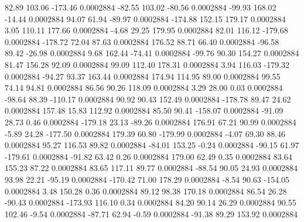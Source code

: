        82.89      103.06     -173.46     0.0002884
      -82.55      103.02      -80.56     0.0002884
      -99.93      168.02      -14.44     0.0002884
       94.07       61.94      -89.97     0.0002884
     -174.88      152.15      179.17     0.0002884
        3.05      110.11      177.66     0.0002884
       -4.68       29.25      179.95     0.0002884
       82.01      116.12     -179.68     0.0002884
     -178.72       72.04       87.63     0.0002884
      176.52       88.71       66.40     0.0002884
      -96.58       89.42      -26.98     0.0002884
        9.68      162.44      -74.41     0.0002884
      -99.76       90.30      154.27     0.0002884
       81.47      156.28       92.09     0.0002884
       99.09      112.40      178.31     0.0002884
        3.94      116.03     -179.32     0.0002884
      -94.27       93.37      163.44     0.0002884
      174.94      114.95       89.00     0.0002884
       99.55       74.14       94.81     0.0002884
       86.56       90.26      118.09     0.0002884
        3.29       28.00        0.03     0.0002884
      -98.64       88.39     -110.17     0.0002884
       90.92       90.43      152.49     0.0002884
     -178.78       89.47       24.62     0.0002884
      157.48       15.83      112.92     0.0002884
       85.50       90.41     -158.07     0.0002884
      -91.09       28.73        0.46     0.0002884
     -179.18       23.13      -89.26     0.0002884
      176.91       67.21       90.99     0.0002884
       -5.89       24.28     -177.50     0.0002884
      179.39       60.80     -179.99     0.0002884
       -4.07       69.30       88.46     0.0002884
       95.27      116.53       89.82     0.0002884
      -84.01      153.25       -0.24     0.0002884
      -90.15       61.97     -179.61     0.0002884
      -91.82       63.42        0.26     0.0002884
      179.00       62.49        0.35     0.0002884
       83.64      155.23       87.22     0.0002884
       83.65      117.11       89.77     0.0002884
      -88.54       90.05       24.93     0.0002884
       93.98       22.21      -95.19     0.0002884
     -170.42       71.00      178.29     0.0002884
       -8.54       90.63     -154.05     0.0002884
        3.48      150.28        0.36     0.0002884
       89.12       98.38      170.18     0.0002884
       86.54       26.28      -90.43     0.0002884
     -173.93      116.10        0.34     0.0002884
       84.20       90.14       26.29     0.0002884
       90.55      102.46       -9.54     0.0002884
      -87.71       62.94       -0.59     0.0002884
      -91.38       89.29      153.92     0.0002884
